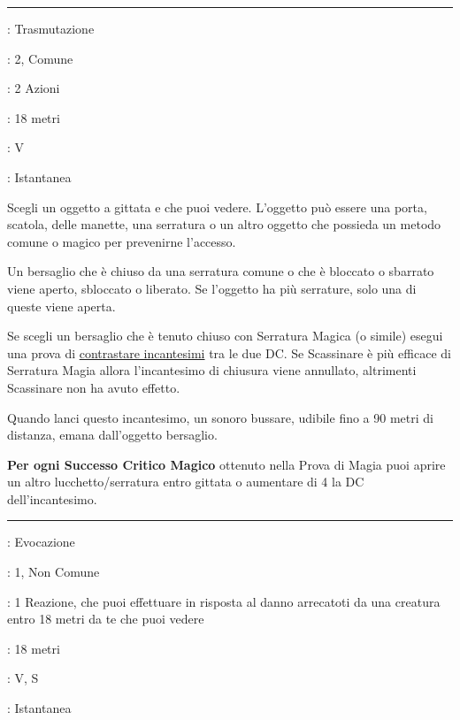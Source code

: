 \begin{multicols}{2}
\smallskip\noindent\rule{\linewidth}{2pt} \hypertarget{Scassinare}{}\medskip{}\label{knock}
\noindent
\begin{description}[noitemsep, topsep=0pt, parsep=0pt, partopsep=0pt, leftmargin=0cm, labelwidth=2.8cm]
	\item[\textbf{Lista di Magia}]: Trasmutazione
	\item[\textbf{Livello}]: 2, Comune
	\item[\textbf{T. di Lancio}]: 2 Azioni
	\item[\textbf{Gittata}]: 18 metri
	\item[\textbf{Componenti}]: V
	\item[\textbf{Durata}]: Istantanea
\end{description}

Scegli un oggetto a gittata e che puoi vedere. L'oggetto può essere una porta, scatola, delle manette, una serratura o un altro oggetto che possieda un metodo comune o magico per prevenirne l'accesso.

Un bersaglio che è chiuso da una serratura comune o che è bloccato o sbarrato viene aperto, sbloccato o liberato. Se l'oggetto ha più serrature, solo una di queste viene aperta.

Se scegli un bersaglio che è tenuto chiuso con Serratura Magica (o simile) esegui una prova di \hyperlink{contrastareincantesimi}{contrastare incantesimi} tra le due DC. Se Scassinare è più efficace di Serratura Magia allora l'incantesimo di chiusura viene annullato, altrimenti Scassinare non ha avuto effetto.

Quando lanci questo incantesimo, un sonoro bussare, udibile fino a 90 metri di distanza, emana dall'oggetto bersaglio.

\textbf{Per ogni Successo Critico Magico} ottenuto nella Prova di Magia puoi aprire un altro lucchetto/serratura entro gittata o aumentare di 4 la DC dell'incantesimo.

\smallskip\noindent\rule{\linewidth}{2pt} \hypertarget{Schiaffo di Cattalm}{}\medskip{}
\noindent
\begin{description}[noitemsep, topsep=0pt, parsep=0pt, partopsep=0pt, leftmargin=0cm, labelwidth=2.8cm]
	\item[\textbf{Lista di Magia}]: Evocazione
	\item[\textbf{Livello}]: 1, Non Comune
	\item[\textbf{T. di Lancio}]: 1 Reazione, che puoi effettuare in risposta al danno arrecatoti da una creatura entro 18 metri da te che puoi vedere
	\item[\textbf{Gittata}]: 18 metri
	\item[\textbf{Componenti}]: V, S
	\item[\textbf{Durata}]: Istantanea
\end{description}


\end{multicols}
